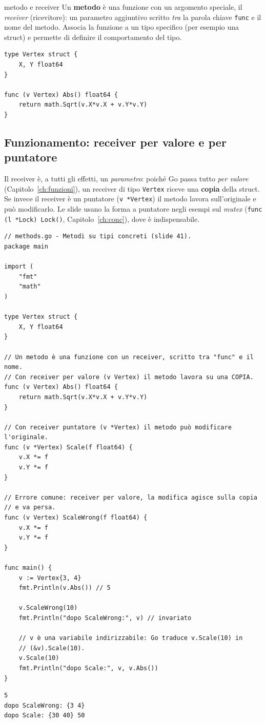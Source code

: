 \documentclass[11pt,a4paper]{report}
\newcommand{\cod}[1]{\texttt{#1}}
\begin{document}
\begin{definizione}{metodo e receiver}
Un \textbf{metodo} è una funzione con un argomento speciale, il \emph{receiver}
(ricevitore): un parametro aggiuntivo scritto \emph{tra} la parola chiave
\cod{func} e il nome del metodo. Associa la funzione a un tipo specifico
(per esempio una struct) e permette di definire il comportamento del tipo.
\end{definizione}

\begin{lstlisting}[style=gocode,numbers=none,caption={Dalla slide: un metodo \cod{Abs} su \cod{Vertex}}]
type Vertex struct {
	X, Y float64
}

func (v Vertex) Abs() float64 {
	return math.Sqrt(v.X*v.X + v.Y*v.Y)
}
\end{lstlisting}

\subsection{Funzionamento: receiver per valore e per puntatore}

Il receiver è, a tutti gli effetti, un \emph{parametro}: poiché Go passa tutto
\emph{per valore} (Capitolo~\ref{ch:funzioni}), un receiver di tipo \cod{Vertex}
riceve una \textbf{copia} della struct. Se invece il receiver è un puntatore
(\cod{v *Vertex}) il metodo lavora sull'originale e può modificarlo. Le slide
usano la forma a puntatore negli esempi sul \emph{mutex} (\cod{func (l *Lock)
Lock()}, Capitolo~\ref{ch:conc}), dove è indispensabile.

\begin{lstlisting}[style=gocode,caption={\texttt{05\_methods\_interfaces/methods.go}}]
// methods.go - Metodi su tipi concreti (slide 41).
package main

import (
	"fmt"
	"math"
)

type Vertex struct {
	X, Y float64
}

// Un metodo è una funzione con un receiver, scritto tra "func" e il nome.
// Con receiver per valore (v Vertex) il metodo lavora su una COPIA.
func (v Vertex) Abs() float64 {
	return math.Sqrt(v.X*v.X + v.Y*v.Y)
}

// Con receiver puntatore (v *Vertex) il metodo può modificare l'originale.
func (v *Vertex) Scale(f float64) {
	v.X *= f
	v.Y *= f
}

// Errore comune: receiver per valore, la modifica agisce sulla copia
// e va persa.
func (v Vertex) ScaleWrong(f float64) {
	v.X *= f
	v.Y *= f
}

func main() {
	v := Vertex{3, 4}
	fmt.Println(v.Abs()) // 5

	v.ScaleWrong(10)
	fmt.Println("dopo ScaleWrong:", v) // invariato

	// v è una variabile indirizzabile: Go traduce v.Scale(10) in
	// (&v).Scale(10).
	v.Scale(10)
	fmt.Println("dopo Scale:", v, v.Abs())
}
\end{lstlisting}
\begin{lstlisting}[style=output]
5
dopo ScaleWrong: {3 4}
dopo Scale: {30 40} 50
\end{lstlisting}
\end{document}
